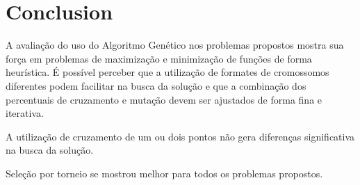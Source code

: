 \documentclass[conference]{IEEEtran}
\begin{document}
\section{Conclusion}
A avaliação do uso do Algoritmo Genético nos problemas propostos mostra sua força em problemas de maximização e minimização de funções de forma heurística. É possível perceber que a utilização de formates de cromossomos diferentes podem facilitar na busca da solução e que a combinação dos percentuais de cruzamento e mutação devem ser ajustados de forma fina e iterativa.

A utilização de cruzamento de um ou dois pontos não gera diferenças significativa na busca da solução.

Seleção por torneio se mostrou melhor para todos os problemas propostos.
\end{document}
